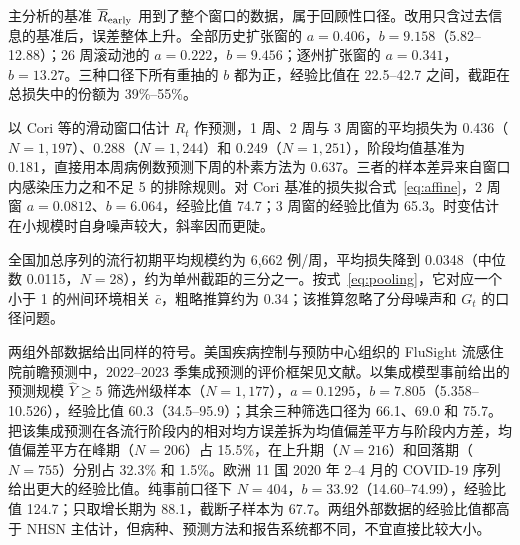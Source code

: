 主分析的基准 $\overline{R}_{\mathrm{early}}$ 用到了整个窗口的数据，属于回顾性口径。改用只含过去信息的基准后，误差整体上升。全部历史扩张窗的 $a=0.406$，$b=9.158$（5.82--12.88）；26 周滚动池的 $a=0.222$，$b=9.456$；逐州扩张窗的 $a=0.341$，$b=13.27$。三种口径下所有重抽的 $b$ 都为正，经验比值在 22.5--42.7 之间，截距在总损失中的份额为 39\%--55\%。

以 Cori 等\citep{cori2013new}的滑动窗口估计 $R_t$ 作预测，1 周、2 周与 3 周窗的平均损失为 0.436（$N=1{,}197$）、0.288（$N=1{,}244$）和 0.249（$N=1{,}251$），阶段均值基准为 0.181，直接用本周病例数预测下周的朴素方法为 0.637。三者的样本差异来自窗口内感染压力之和不足 5 的排除规则。对 Cori 基准的损失拟合式~\eqref{eq:affine}，2 周窗 $a=0.0812$、$b=6.064$，经验比值 74.7；3 周窗的经验比值为 65.3。时变估计在小规模时自身噪声较大，斜率因而更陡。

全国加总序列的流行初期平均规模约为 6,662 例/周，平均损失降到 0.0348（中位数 0.0115，$N=28$），约为单州截距的三分之一。按式~\eqref{eq:pooling}，它对应一个小于 1 的州间环境相关 $\bar c$，粗略推算约为 0.34；该推算忽略了分母噪声和 $G_t$ 的口径问题。

两组外部数据给出同样的符号。美国疾病控制与预防中心组织的 FluSight 流感住院前瞻预测中，2022--2023 季集成预测\citep{mathis2024evaluation}的评价框架见文献\citep{reich2019accuracy, cramer2022evaluation}。以集成模型事前给出的预测规模 $\widehat Y\geq5$ 筛选州级样本（$N=1{,}177$），$a=0.1295$，$b=7.805$（5.358--10.526），经验比值 60.3（34.5--95.9）；其余三种筛选口径为 66.1、69.0 和 75.7。把该集成预测在各流行阶段内的相对均方误差拆为均值偏差平方与阶段内方差，均值偏差平方在峰期（$N=206$）占 15.5\%，在上升期（$N=216$）和回落期（$N=755$）分别占 32.3\% 和 1.5\%。欧洲 11 国 2020 年 2--4 月的 COVID-19 序列\citep{flaxman2020estimating}给出更大的经验比值。纯事前口径下 $N=404$，$b=33.92$（14.60--74.99），经验比值 124.7；只取增长期为 88.1，截断子样本为 67.7。两组外部数据的经验比值都高于 NHSN 主估计，但病种、预测方法和报告系统都不同，不宜直接比较大小。
